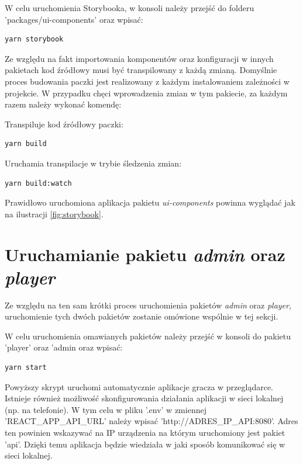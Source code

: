 W celu uruchomienia Storybooka, w konsoli należy przejść do folderu 'packages/ui-components' oraz wpisać:

\begin{lstlisting}[caption={Uruchamianie aplikacji w pakiecie ui-components}]
yarn storybook
\end{lstlisting}

Ze względu na fakt importowania komponentów oraz konfiguracji w innych pakietach kod źródłowy musi być transpilowany z każdą zmianą. Domyślnie proces budowania paczki jest realizowany z każdym instalowaniem zależności w projekcie. W przypadku chęci wprowadzenia zmian w tym pakiecie, za każdym razem należy wykonać komendę:

Transpiluje kod źródłowy paczki:
\begin{lstlisting}[caption={Budowanie paczki ui-components}]
yarn build
\end{lstlisting}

Uruchamia transpilacje w trybie śledzenia zmian:
\begin{lstlisting}[caption={Uruchamianie budowania paczki ui-components w trybie śledzenia zmian}]
yarn build:watch
\end{lstlisting}

Prawidłowo uruchomiona aplikacja pakietu \textit{ui-components} powinna wyglądać jak na ilustracji \ref{fig:storybook}.

\section{Uruchamianie pakietu \textit{admin} oraz \textit{player}}
Ze względu na ten sam krótki proces uruchomienia pakietów \textit{admin} oraz \textit{player}, uruchomienie tych dwóch pakietów zostanie omówione wspólnie w tej sekcji.

W celu uruchomienia omawianych pakietów należy przejść w konsoli do pakietu 'player' oraz 'admin oraz wpisać:

\begin{lstlisting}[caption={Uruchomienie pakietu player oraz admin}]
yarn start
\end{lstlisting}

Powyższy skrypt uruchomi automatycznie aplikacje gracza w przeglądarce. Istnieje również możliwość skonfigurowania działania aplikacji w sieci lokalnej (np. na telefonie). W tym celu w pliku '.env' w zmiennej 'REACT\_APP\_API\_URL' należy wpisać 'http://{ADRES\_IP\_API}:8080'. Adres ten powinien wskazywać na IP urządzenia na którym uruchomiony jest pakiet 'api'. Dzięki temu aplikacja będzie wiedziała w jaki sposób komunikować się w sieci lokalnej.

